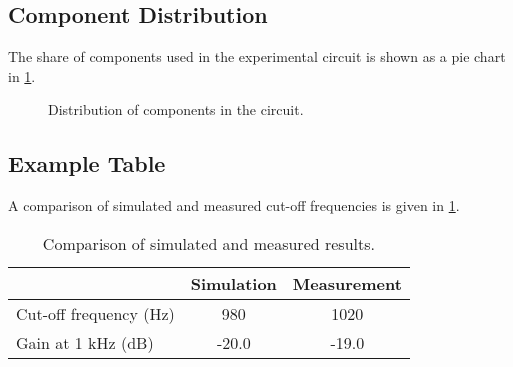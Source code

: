 \subsection{Component Distribution}
The share of components used in the experimental circuit is shown as a pie chart in \cref{fig:pie}.

\begin{figure}[ht]
\centering
{}
\caption{Distribution of components in the circuit.}
\label{fig:pie}
\end{figure}

\subsection{Example Table}
A comparison of simulated and measured cut-off frequencies is given in \cref{tab:cutoff}.

\begin{table}[ht]
\centering
\begin{tabular}{lcc}
\toprule
 & Simulation & Measurement \\
\midrule
Cut-off frequency (Hz) & 980 & 1020 \\
Gain at 1 kHz (dB)     & -20.0 & -19.0 \\
\bottomrule
\end{tabular}
\caption{Comparison of simulated and measured results.}
\label{tab:cutoff}
\end{table}